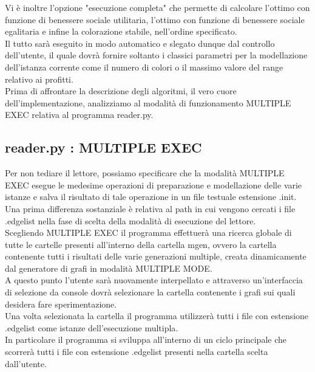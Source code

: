 Vi è inoltre l'opzione "esecuzione completa" che permette di calcolare l'ottimo con funzione di benessere sociale utilitaria, l'ottimo con funzione di benessere sociale egalitaria e infine la colorazione stabile, nell'ordine specificato.\\
Il tutto sarà eseguito in modo automatico e slegato dunque dal controllo dell'utente, il quale dovrà fornire soltanto i classici parametri per la modellazione dell'istanza corrente come il numero di colori o il massimo valore del range relativo ai profitti.\\

Prima di affrontare la descrizione degli algoritmi, il vero cuore dell'implementazione, analizziamo al modalità di funzionamento MULTIPLE EXEC relativa al programma reader.py.\\

\subsection{reader.py : MULTIPLE EXEC}
\justify
Per non tediare il lettore, possiamo specificare che la modalità MULTIPLE EXEC esegue le medesime operazioni di preparazione e modellazione delle varie istanze e salva il risultato di tale operazione in un file testuale estensione .init.\\

Una prima differenza sostanziale è relativa al path in cui vengono cercati i file .edgelist nella fase di scelta della modalità di esecuzione del lettore.\\
Scegliendo MULTIPLE EXEC il programma effettuerà una ricerca globale di tutte le cartelle presenti all'interno della cartella mgen, ovvero la cartella contenente tutti i risultati delle varie generazioni multiple, creata dinamicamente dal generatore di grafi in modalità MULTIPLE MODE.\\

A questo punto l'utente sarà nuovamente interpellato e attraverso un'interfaccia di selezione da console dovrà selezionare la cartella contenente i grafi sui quali desidera fare sperimentazione.\\
Una volta selezionata la cartella il programma utilizzerà tutti i file con estensione .edgelist come istanze dell'esecuzione multipla.\\
In particolare il programma si sviluppa all'interno di un ciclo principale che scorrerà tutti i file con estensione .edgelist presenti nella cartella scelta dall'utente.\\

